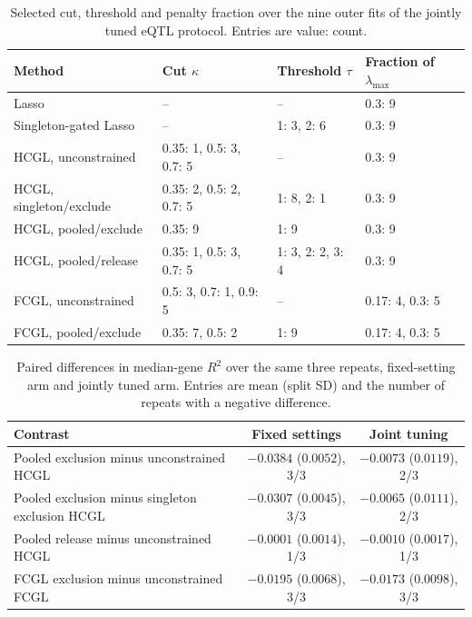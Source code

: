 \documentclass[11pt,a4paper]{article}
\begin{document}
\begin{table}[htbp]\centering\small
\caption{Selected cut, threshold and penalty fraction over the nine outer fits
of the jointly tuned eQTL protocol. Entries are value: count.}
\label{tab:eqtl-joint-selections}
\begin{tabular}{llll}\toprule
Method & Cut $\kappa$ & Threshold $\tau$ & Fraction of $\lambda_{\max}$\\\midrule
Lasso & -- & -- & 0.3: 9 \\
Singleton-gated Lasso & -- & 1: 3, 2: 6 & 0.3: 9 \\
HCGL, unconstrained & 0.35: 1, 0.5: 3, 0.7: 5 & -- & 0.3: 9 \\
HCGL, singleton/exclude & 0.35: 2, 0.5: 2, 0.7: 5 & 1: 8, 2: 1 & 0.3: 9 \\
HCGL, pooled/exclude & 0.35: 9 & 1: 9 & 0.3: 9 \\
HCGL, pooled/release & 0.35: 1, 0.5: 3, 0.7: 5 & 1: 3, 2: 2, 3: 4 & 0.3: 9 \\
FCGL, unconstrained & 0.5: 3, 0.7: 1, 0.9: 5 & -- & 0.17: 4, 0.3: 5 \\
FCGL, pooled/exclude & 0.35: 7, 0.5: 2 & 1: 9 & 0.17: 4, 0.3: 5 \\
\bottomrule\end{tabular}
\end{table}

\begin{table}[htbp]\centering\small
\caption{Paired differences in median-gene $R^2$ over the same three repeats,
fixed-setting arm and jointly tuned arm. Entries are mean (split SD) and the
number of repeats with a negative difference.}
\label{tab:eqtl-joint-contrasts}
\begin{tabular}{lcc}\toprule
Contrast & Fixed settings & Joint tuning\\\midrule
Pooled exclusion minus unconstrained HCGL & $-0.0384$ ($0.0052$), 3/3 & $-0.0073$ ($0.0119$), 2/3 \\
Pooled exclusion minus singleton exclusion HCGL & $-0.0307$ ($0.0045$), 3/3 & $-0.0065$ ($0.0111$), 2/3 \\
Pooled release minus unconstrained HCGL & $-0.0001$ ($0.0014$), 1/3 & $-0.0010$ ($0.0017$), 1/3 \\
FCGL exclusion minus unconstrained FCGL & $-0.0195$ ($0.0068$), 3/3 & $-0.0173$ ($0.0098$), 3/3 \\
\bottomrule\end{tabular}
\end{table}
\end{document}
